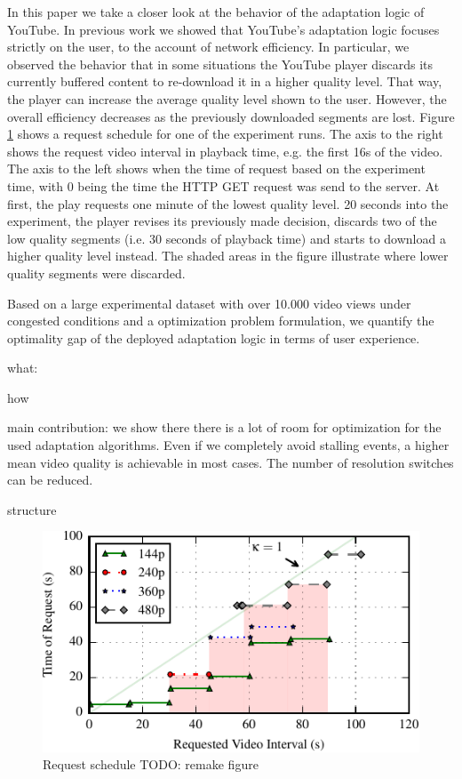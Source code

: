 In this paper we take a closer look at the behavior of the adaptation logic of YouTube.
In previous work we showed that YouTube's adaptation logic focuses strictly on the user, to the account of network efficiency.
In particular, we observed the behavior that in some situations the YouTube player discards its currently buffered content to re-download it in a higher quality level.
That way, the player can increase the average quality level shown to the user.
However, the overall efficiency decreases as the previously downloaded segments are lost.
Figure \ref{fig:request_schedule} shows a request schedule for one of the experiment runs.
The axis to the right shows the request video interval in playback time, e.g. the first 16s of the video.
The axis to the left shows when the time of request based on the experiment time, with 0 being the time the HTTP GET request was send to the server.
At first, the play requests one minute of the lowest quality level.
20 seconds into the experiment, the player revises its previously made decision, discards two of the low quality segments (i.e. 30 seconds of playback time) and starts to download a higher quality level instead.
The shaded areas in the figure illustrate where lower quality segments were discarded.

Based on a large experimental dataset with over 10.000 video views under congested conditions and a optimization problem formulation, we quantify the optimality gap of the deployed adaptation logic in terms of user experience.






what:

how

main contribution: we show there there is a lot of room for optimization for the used adaptation algorithms. Even if we completely avoid stalling events, a higher mean video quality is achievable in most cases. The number of resolution switches can be reduced.

structure


\begin{figure}[t]
\centering
\includegraphics[width=0.9\linewidth]{figs/eg_request_schedule}%
\caption{Request schedule TODO: remake figure}
\label{fig:request_schedule}%
\end{figure}

\cite{sieber16sacrificing,sieber15costaggressive}